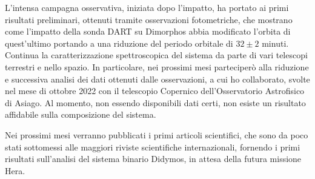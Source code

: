 \documentclass[a4paper,11pt,openright]{book}
\begin{document}
L'intensa campagna osservativa, iniziata dopo l'impatto, ha portato ai primi risultati preliminari, ottenuti tramite osservazioni fotometriche, che mostrano come l'impatto della sonda DART su Dimorphos abbia modificato l'orbita di quest'ultimo portando a una riduzione del periodo orbitale di $32 \pm 2$ minuti.\\
Continua la caratterizzazione spettroscopica del sistema da parte di vari telescopi terrestri e nello spazio. In particolare, nei prossimi mesi parteciperò alla riduzione e successiva analisi dei dati ottenuti dalle osservazioni, a cui ho collaborato, svolte nel mese di ottobre 2022 con il telescopio Copernico dell'Osservatorio Astrofisico di Asiago. Al momento, non essendo disponibili dati certi, non esiste un risultato affidabile sulla composizione del sistema. 

Nei prossimi mesi verranno pubblicati i primi articoli scientifici, che sono da poco stati sottomessi alle maggiori riviste scientifiche internazionali, fornendo i primi risultati sull'analisi del sistema binario Didymos, in attesa della futura missione Hera.








\cleardoublepage
{}
\printbibliography
\end{document}
